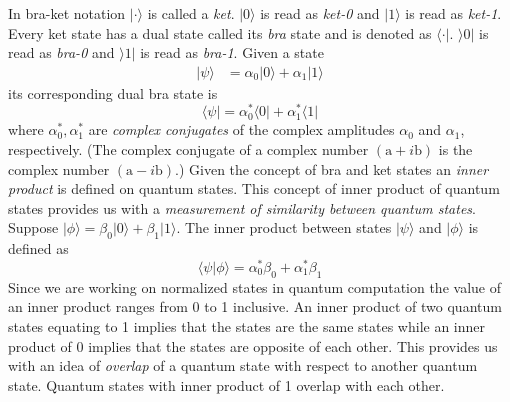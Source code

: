 In bra-ket notation $\vert \cdot \rangle$ is called a \textit{ket}. $\vert 0 \rangle$ is read as \textit{ket-0} and $\vert 1 \rangle$ is read as \textit{ket-1}. Every ket state has a dual state called its \textit{bra} state and is denoted as $\langle \cdot \vert$. $\rangle 0 \vert$ is read as \textit{bra-0} and $\rangle 1 \vert$ is read as \textit{bra-1}. Given a state 
\begin{align*}
\vert \psi \rangle &= \alpha_0 \vert 0 \rangle + \alpha_1 \vert 1 \rangle
\end{align*}
its corresponding dual bra state is 
\[
	\langle \psi \vert = \alpha_0^* \langle 0 \vert + \alpha_1^* \langle 1 \vert
\]
where $\alpha_0^*, \alpha_1^*$ are \textit{complex conjugates} of the complex amplitudes $\alpha_0$ and $\alpha_1$, respectively. (The complex conjugate of a complex number $(\text{a} + i\text{b})$ is the complex number $(\text{a} - i\text{b})$.) Given the concept of bra and ket states an \textit{inner product} is defined on quantum states. This concept of inner product of quantum states provides us with a \textit{measurement of similarity between quantum states}. Suppose $\vert \phi \rangle = \beta_0\vert 0 \rangle + \beta_1\vert 1 \rangle$. The inner product between states $\vert \psi \rangle$ and $\vert \phi \rangle$ is defined as
\[
	\langle \psi \vert \phi \rangle = \alpha_0^* \beta_0 + \alpha_1^* \beta_1
\]
Since we are working on normalized states in quantum computation the value of an inner product ranges from 0 to 1 inclusive. An inner product of two quantum states equating to 1 implies that the states are the same states while an inner product of 0 implies that the states are opposite of each other. This provides us with an idea of \textit{overlap} of a quantum state with respect to another quantum state. Quantum states with inner product of 1 overlap with each other.

